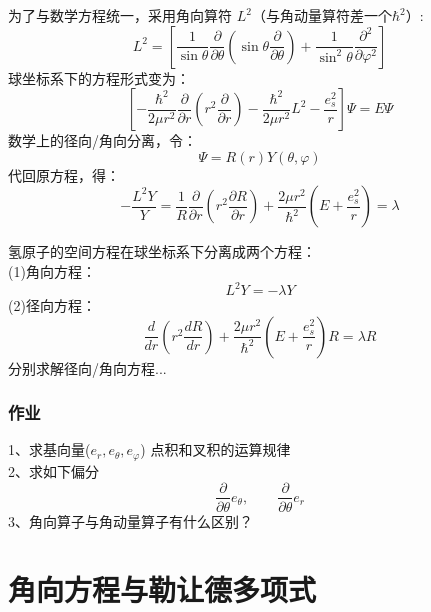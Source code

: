 \begin{frame}
	为了与数学方程统一，采用角向算符 $L^2$（与角动量算符差一个$\hbar ^2$）:
	\begin{equation*}
		L^2 =  \left[ \frac{1}{ \sin \theta  } \frac{\partial }{\partial \theta } (\sin \theta \frac{\partial }{\partial \theta } )
		+\frac{1}{ \sin^2 \theta  } \frac{\partial^2}{\partial\varphi ^2} \right]
	\end{equation*}	
	球坐标系下的方程形式变为：
	\begin{equation*}
		\left[-\frac{\hbar^2}{2 \mu r^2}  \frac{\partial }{\partial r} (r^2\frac{\partial }{\partial r} ) -  \frac{\hbar ^2 }{2 \mu r^2} L^2  -\frac{e_s ^2}{r} \right] \Psi
		=E\Psi
	\end{equation*}	
	数学上的径向/角向分离，令： 
	\begin{equation*}
		\Psi=R (r) Y(\theta,\varphi)
	\end{equation*}	
	代回原方程，得：
	\begin{equation*}
		-\frac{ L^2 Y}{Y}= \frac{1}{R}   \frac{\partial }{\partial r} (r^2\frac{\partial R }{\partial r} ) + \frac{2 \mu r^2} {\hbar^2}(E+ \frac{e_s ^2}{r} )=\lambda
	\end{equation*}	
\end{frame}		

\begin{frame}
	氢原子的空间方程在球坐标系下分离成两个方程：	\\
	(1)角向方程：
	\begin{equation*}
		L^2 Y=-\lambda Y 
	\end{equation*}	
	(2)径向方程：
	\begin{equation*}
		\frac{d}{d r} (r^2\frac{d R }{d r} ) + \frac{2 \mu r^2} {\hbar^2}(E+ \frac{e_s ^2}{r} ) R =\lambda R
	\end{equation*}	
	分别求解径向/角向方程...
\end{frame}	

\begin{frame}
	\frametitle{ 作业 }
	1、求基向量($e_r, e_\theta, e_\varphi$) 点积和叉积的运算规律\\
	2、求如下偏分
	\begin{equation*}
	\frac{\partial }{\partial \theta}  e_\theta, \qquad \frac{\partial }{\partial \theta}  e_r 
	\end{equation*}	
    3、角向算子与角动量算子有什么区别？
\end{frame}	

\section{角向方程与勒让德多项式}

